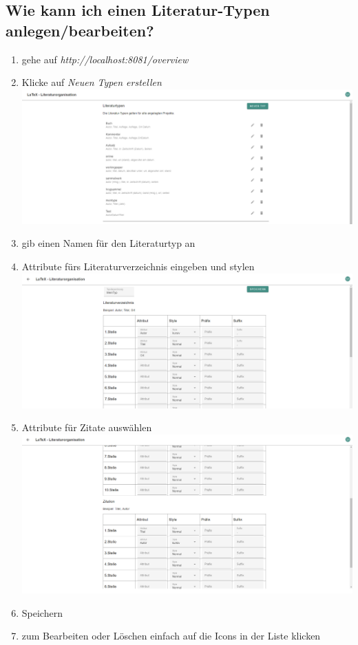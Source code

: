 \documentclass[12pt]{article}
\begin{document}
\subsection{Wie kann ich einen Literatur-Typen anlegen/bearbeiten?}
\begin{enumerate}
\item gehe auf \textit{http://localhost:8081/overview}
\item Klicke auf \textit{Neuen Typen erstellen}\newline
\includegraphics[width=\linewidth]{dokuImages/gui1_1.png}
\item gib einen Namen für den Literaturtyp an\\
\item Attribute fürs Literaturverzeichnis eingeben und stylen\\
\includegraphics[width=\linewidth]{dokuImages/gui1_2.png}
\item Attribute für Zitate auswählen\\
\includegraphics[width=\linewidth]{dokuImages/gui1_3.png}
\item Speichern
\item zum Bearbeiten oder Löschen einfach auf die Icons in der Liste klicken
\end{enumerate}
\end{document}
